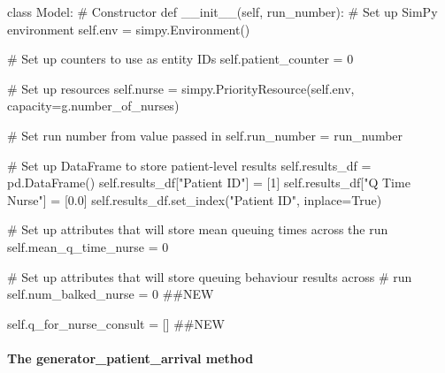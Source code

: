 \documentclass[
  letterpaper,
  DIV=11,
  numbers=noendperiod]{scrreprt}
\let\oldparagraph\paragraph
\renewcommand{\paragraph}[1]{\oldparagraph{#1}\mbox{}}
\newenvironment{Shaded}{}{}
\newcommand{\CommentTok}[1]{\textcolor[rgb]{0.42,0.45,0.49}{#1}}
\newcommand{\DecValTok}[1]{\textcolor[rgb]{0.00,0.36,0.77}{#1}}
\newcommand{\FloatTok}[1]{\textcolor[rgb]{0.00,0.36,0.77}{#1}}
\newcommand{\FunctionTok}[1]{\textcolor[rgb]{0.44,0.26,0.76}{#1}}
\newcommand{\KeywordTok}[1]{\textcolor[rgb]{0.84,0.23,0.29}{#1}}
\newcommand{\NormalTok}[1]{\textcolor[rgb]{0.14,0.16,0.18}{#1}}
\newcommand{\OperatorTok}[1]{\textcolor[rgb]{0.14,0.16,0.18}{#1}}
\newcommand{\StringTok}[1]{\textcolor[rgb]{0.01,0.18,0.38}{#1}}
\newcommand{\VariableTok}[1]{\textcolor[rgb]{0.89,0.38,0.04}{#1}}
\begin{document}
\begin{Shaded}
\begin{Highlighting}[]
\KeywordTok{class}\NormalTok{ Model:}
    \CommentTok{\# Constructor}
    \KeywordTok{def} \FunctionTok{\_\_init\_\_}\NormalTok{(}\VariableTok{self}\NormalTok{, run\_number):}
        \CommentTok{\# Set up SimPy environment}
        \VariableTok{self}\NormalTok{.env }\OperatorTok{=}\NormalTok{ simpy.Environment()}

        \CommentTok{\# Set up counters to use as entity IDs}
        \VariableTok{self}\NormalTok{.patient\_counter }\OperatorTok{=} \DecValTok{0}

        \CommentTok{\# Set up resources}
        \VariableTok{self}\NormalTok{.nurse }\OperatorTok{=}\NormalTok{ simpy.PriorityResource(}\VariableTok{self}\NormalTok{.env,}
\NormalTok{                                            capacity}\OperatorTok{=}\NormalTok{g.number\_of\_nurses)}

        \CommentTok{\# Set run number from value passed in}
        \VariableTok{self}\NormalTok{.run\_number }\OperatorTok{=}\NormalTok{ run\_number}

        \CommentTok{\# Set up DataFrame to store patient{-}level results}
        \VariableTok{self}\NormalTok{.results\_df }\OperatorTok{=}\NormalTok{ pd.DataFrame()}
        \VariableTok{self}\NormalTok{.results\_df[}\StringTok{"Patient ID"}\NormalTok{] }\OperatorTok{=}\NormalTok{ [}\DecValTok{1}\NormalTok{]}
        \VariableTok{self}\NormalTok{.results\_df[}\StringTok{"Q Time Nurse"}\NormalTok{] }\OperatorTok{=}\NormalTok{ [}\FloatTok{0.0}\NormalTok{]}
        \VariableTok{self}\NormalTok{.results\_df.set\_index(}\StringTok{"Patient ID"}\NormalTok{, inplace}\OperatorTok{=}\VariableTok{True}\NormalTok{)}

        \CommentTok{\# Set up attributes that will store mean queuing times across the run}
        \VariableTok{self}\NormalTok{.mean\_q\_time\_nurse }\OperatorTok{=} \DecValTok{0}

        \CommentTok{\# Set up attributes that will store queuing behaviour results across}
        \CommentTok{\# run}
        \VariableTok{self}\NormalTok{.num\_balked\_nurse }\OperatorTok{=} \DecValTok{0} \CommentTok{\#\#NEW}

        \VariableTok{self}\NormalTok{.q\_for\_nurse\_consult }\OperatorTok{=}\NormalTok{ [] }\CommentTok{\#\#NEW}
\end{Highlighting}
\end{Shaded}

\paragraph{The generator\_patient\_arrival
method}\label{the-generator_patient_arrival-method}
\end{document}
